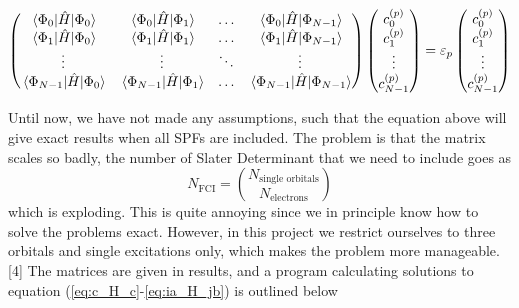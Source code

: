 \begin{equation}
\begin{pmatrix}
\mel{\Phi_0}{\hat{H}}{\Phi_0} & \mel{\Phi_0}{\hat{H}}{\Phi_1} & \hdots & \mel{\Phi_0}{\hat{H}}{\Phi_{N-1}}\\
\mel{\Phi_1}{\hat{H}}{\Phi_0} & \mel{\Phi_1}{\hat{H}}{\Phi_1} & \hdots & \mel{\Phi_1}{\hat{H}}{\Phi_{N-1}}\\
\vdots & \vdots & \ddots & \vdots\\
\mel{\Phi_{N-1}}{\hat{H}}{\Phi_0} & \mel{\Phi_{N-1}}{\hat{H}}{\Phi_1} & \hdots & \mel{\Phi_{N-1}}{\hat{H}}{\Phi_{N-1}}\\
\end{pmatrix}
\begin{pmatrix}
c_0^{(p)}\\ c_1^{(p)} \\ \vdots\\ c_{N-1}^{(p)}
\end{pmatrix}
=\varepsilon_p
\begin{pmatrix}
c_0^{(p)}\\ c_1^{(p)} \\ \vdots\\ c_{N-1}^{(p)}
\end{pmatrix}
\label{eq:CIS_matrix}
\end{equation}

Until now, we have not made any assumptions, such that the equation above will give exact results when all SPFs are included. The problem is that the matrix scales so badly, the number of Slater Determinant that we need to include goes as 
\begin{equation}
N_{\text{FCI}}=\binom{N_{\text{single orbitals}}}{N_{\text{electrons}}}
\end{equation}
which is exploding. This is quite annoying since we in principle know how to solve the problems exact. However, in this project we restrict ourselves to three orbitals and single excitations only, which makes the problem more manageable. [4] The matrices are given in results, and a program calculating solutions to equation (\ref{eq:c_H_c}-\ref{eq:ia_H_jb}) is outlined below

